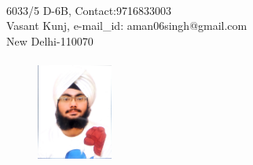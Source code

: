 \documentclass{article}
\begin{document}
\\


\begin{flushleft}
6033/5 D-6B, \hfill{Contact:9716833003}\\
Vasant Kunj, \hfill{e-mail\_id: aman06singh@gmail.com}\\
New Delhi-110070\\
\end{flushleft}

\begin{figure}[h]
\begin{flushright}	
\includegraphics[width=2.5cm, height=3.5cm]{pic.jpg}	
\end{flushright}
\end{figure}
\end{document}
